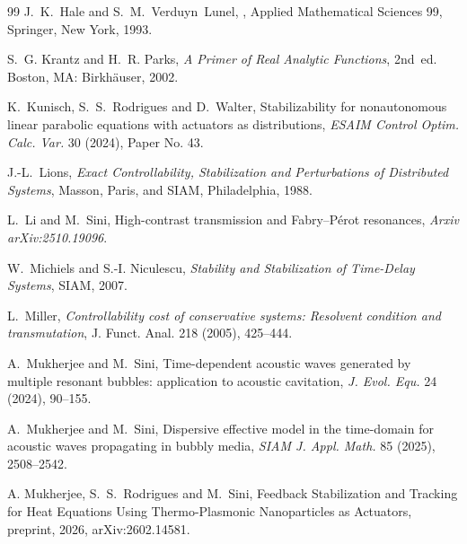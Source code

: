 \documentclass[11pt,a4paper]{article}
\numberwithin{equation}{section}
\begin{document}
\begin{thebibliography}{99}
J.~K.~Hale and S.~M.~Verduyn~Lunel,
,
\newblock Applied Mathematical Sciences 99, Springer, New York, 1993.





S.~G. Krantz and H.~R. Parks, \emph{A Primer of Real Analytic Functions}, 2nd~ed. Boston, MA: Birkh\"{a}user, 2002.


K.~Kunisch, S.~S.~Rodrigues and D.~Walter,
Stabilizability for nonautonomous linear parabolic equations with actuators as distributions,
\emph{ESAIM Control Optim. Calc. Var.} 30 (2024), Paper No. 43.

J.-L.~Lions,
\emph{Exact Controllability, Stabilization and Perturbations of Distributed Systems},
Masson, Paris, and SIAM, Philadelphia, 1988.

L.~Li and M.~Sini,
High-contrast transmission and Fabry--P\'erot resonances,
{\em Arxiv arXiv:2510.19096}.

W.~Michiels and S.-I. Niculescu,
\newblock \emph{Stability and Stabilization of Time-Delay Systems},
\newblock SIAM, 2007.

L.~Miller,
\newblock \emph{Controllability cost of conservative systems: Resolvent
  condition and transmutation},
\newblock J. Funct. Anal. 218 (2005), 425--444.


A.~Mukherjee and M.~Sini,
Time-dependent acoustic waves generated by multiple resonant bubbles: application to acoustic cavitation,
\emph{J. Evol. Equ.} 24 (2024), 90--155.

A.~Mukherjee and M.~Sini,
Dispersive effective model in the time-domain for acoustic waves propagating in bubbly media,
\emph{SIAM J. Appl. Math.} 85 (2025), 2508--2542.




A. Mukherjee, S.~S.~Rodrigues and M.~Sini,
Feedback Stabilization and Tracking for Heat Equations Using Thermo-Plasmonic Nanoparticles as Actuators,
preprint, 2026, arXiv:2602.14581.



\end{thebibliography}
\end{document}
